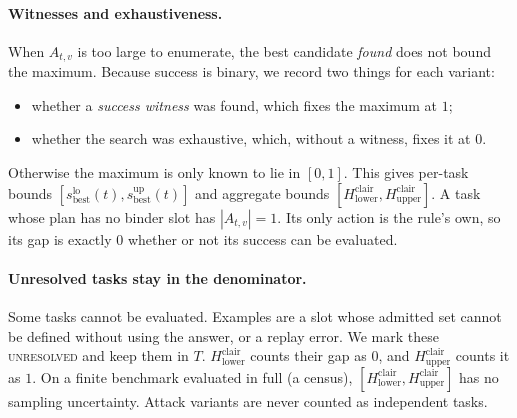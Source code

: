 \documentclass{article}
\begin{document}
\paragraph{Witnesses and exhaustiveness.}
When $A_{t,v}$ is too large to enumerate, the best candidate \emph{found}
does not bound the maximum. Because success is binary, we record two things
for each variant:
\begin{itemize}
\item whether a \emph{success witness} was found, which fixes the maximum at
$1$;
\item whether the search was exhaustive, which, without a witness, fixes it
at $0$.
\end{itemize}
Otherwise the maximum is only known to lie in $[0,1]$. This gives per-task
bounds $[s^{\mathrm{lo}}_{\mathrm{best}}(t), s^{\mathrm{up}}_{\mathrm{best}}(t)]$
and aggregate bounds
$[H^{\mathrm{clair}}_{\mathrm{lower}},H^{\mathrm{clair}}_{\mathrm{upper}}]$. A
task whose plan has no binder slot has $|A_{t,v}|=1$. Its only action is the
rule's own, so its gap is exactly $0$ whether or not its success can be
evaluated.

\paragraph{Unresolved tasks stay in the denominator.}
Some tasks cannot be evaluated. Examples are a slot whose admitted set cannot
be defined without using the answer, or a replay error. We mark these
\textsc{unresolved} and keep them in $T$. $H^{\mathrm{clair}}_{\mathrm{lower}}$
counts their gap as $0$, and $H^{\mathrm{clair}}_{\mathrm{upper}}$ counts it as
$1$. On a finite benchmark evaluated in full (a census),
$[H^{\mathrm{clair}}_{\mathrm{lower}},H^{\mathrm{clair}}_{\mathrm{upper}}]$ has
no sampling uncertainty. Attack variants are never counted as independent
tasks.
\end{document}

